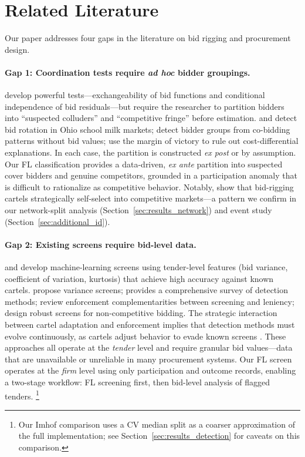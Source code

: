 \section{Related Literature}
\label{sec:literature}

Our paper addresses four gaps in the literature on bid rigging and
procurement design.

\paragraph{Gap 1: Coordination tests require \emph{ad hoc} bidder
groupings.}
\citet{bajari2003deciding} develop powerful tests---exchangeability of
bid functions and conditional independence of bid residuals---but
require the researcher to partition bidders into ``suspected
colluders'' and ``competitive fringe'' before estimation.
\citet{porter1993detection} and \citet{porter1999ohio} detect bid
rotation in Ohio school milk markets; \citet{conley2016detecting}
detect bidder groups from co-bidding patterns without bid values;
\citet{kawai2019using} use the margin of victory to rule out
cost-differential explanations.
In each case, the partition is constructed \emph{ex post} or by
assumption. Our FL classification provides a data-driven,
\emph{ex ante} partition into suspected cover bidders and genuine
competitors, grounded in a participation anomaly that is difficult
to rationalize as competitive behavior.
Notably, \citet{porter1993detection} show that bid-rigging cartels
strategically self-select into competitive markets---a pattern we
confirm in our network-split analysis
(Section~\ref{sec:results_network}) and event study
(Section~\ref{sec:additional_id}).

\paragraph{Gap 2: Existing screens require bid-level data.}
\citet{imhof2019detecting} and \citet{imhof2018screening} develop
machine-learning screens using tender-level features (bid variance,
coefficient of variation, kurtosis) that achieve high accuracy against
known cartels. \citet{abrantesmetz2006a} propose variance screens;
\citet{harrington2008detecting} provides a comprehensive survey of
detection methods; \citet{hüschelrath2014cartel} review enforcement
complementarities between screening and leniency;
\citet{chassang2022robust} design robust screens for non-competitive
bidding. The strategic interaction between cartel adaptation and
enforcement implies that detection methods must evolve continuously,
as cartels adjust behavior to evade known screens
\citep{harrington2008detecting}.
These approaches all operate at the \emph{tender} level and
require granular bid values---data that are unavailable or unreliable
in many procurement systems. Our FL screen operates at the \emph{firm}
level using only participation and outcome records, enabling a
two-stage workflow: FL screening first, then bid-level analysis of
flagged tenders.%
\footnote{Our Imhof comparison uses a CV median split as a coarser
approximation of the full \citet{imhof2019detecting} implementation;
see Section~\ref{sec:results_detection} for caveats on this
comparison.}

